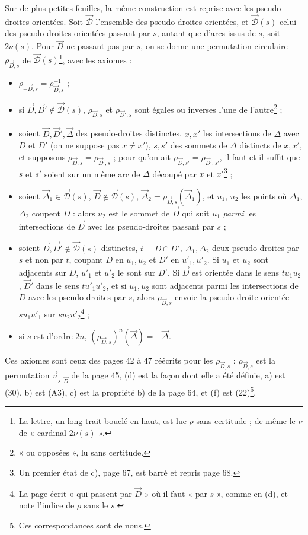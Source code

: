 \documentclass[11pt,a4paper]{article}
\begin{document}
Sur de plus petites feuilles, la même construction est reprise avec les
pseudo-droites orientées. Soit $\vec{\mathcal{D}}$ l'ensemble des
pseudo-droites orientées, et $\vec{\mathcal{D}}(s)$ celui des pseudo-droites
orientées passant par $s$, autant que d'arcs issus de $s$, soit $2\nu(s)$.
Pour $\vec{D}$ ne passant pas par $s$, on se donne une permutation circulaire
$\rho_{\vec{D},s}$ de $\vec{\mathcal{D}}(s)$\footnote{La lettre, un long trait
bouclé en haut, est lue $\rho$ sans certitude ; de même le $\nu$ de
« cardinal $2\nu(s)$ ».}, avec les axiomes :
\begin{itemize}
  \item[a)] $\rho_{-\vec{D},s} = \rho_{\vec{D},s}^{-1}$ ;
  \item[b)] si $\vec{D}, \vec{D}' \notin \vec{\mathcal{D}}(s)$, $\rho_{\vec{D},s}$ et
  $\rho_{\vec{D}',s}$ sont égales ou inverses l'une de l'autre\footnote{« ou
  opposées », lu sans certitude.} ;
  \item[c)] soient $\vec{D}, \vec{D}', \vec{\Delta}$ des pseudo-droites
  distinctes, $x, x'$ les intersections de $\Delta$ avec $D$ et $D'$ (on ne
  suppose pas $x \neq x'$), $s, s'$ des sommets de $\Delta$ distincts de $x,
  x'$, et supposons $\rho_{\vec{D},s} = \rho_{\vec{D}',s}$ ; pour qu'on ait
  $\rho_{\vec{D},s'} = \rho_{\vec{D}',s'}$, il faut et il suffit que $s$ et
  $s'$ soient sur un même arc de $\Delta$ découpé par $x$ et
  $x'$\footnote{Un premier état de c), page 67, est barré et repris page
  68.} ;
  \item[(d)] soient $\vec{\Delta}_1 \in \vec{\mathcal{D}}(s)$, $\vec{D} \notin
  \vec{\mathcal{D}}(s)$, $\vec{\Delta}_2 = \rho_{\vec{D},s}(\vec{\Delta}_1)$,
  et $u_1$, $u_2$ les points où $\Delta_1$, $\Delta_2$ coupent $D$ : alors
  $u_2$ est le sommet de $\vec{D}$ qui suit $u_1$ \emph{parmi} les
  intersections de $\vec{D}$ avec les pseudo-droites passant par $s$ ;
  \item[(e)] soient $\vec{D}, \vec{D}' \notin \vec{\mathcal{D}}(s)$ distinctes,
  $t = D \cap D'$, $\Delta_1, \Delta_2$ deux pseudo-droites par $s$ et non par
  $t$, coupant $D$ en $u_1, u_2$ et $D'$ en $u'_1, u'_2$. Si $u_1$ et $u_2$ sont
  adjacents sur $D$, $u'_1$ et $u'_2$ le sont sur $D'$. Si $\vec{D}$ est
  orientée dans le sens $t u_1 u_2$, $\vec{D}'$ dans le sens $t u'_1 u'_2$, et
  si $u_1, u_2$ sont adjacents parmi les intersections de $D$ avec les
  pseudo-droites par $s$, alors $\rho_{\vec{D},s}$ envoie la pseudo-droite
  orientée $s u_1 u'_1$ sur $s u_2 u'_2$\footnote{La page écrit « qui passent
  par $\vec{D}$ » où il faut « par $s$ », comme en (d), et note l'indice de
  $\rho$ sans le $s$.} ;
  \item[(f)] si $s$ est d'ordre $2n$, $(\rho_{\vec{D},s})^n(\vec{\Delta}) =
  -\vec{\Delta}$.
\end{itemize}
Ces axiomes sont ceux des pages 42 à 47 réécrits pour les
$\rho_{\vec{D},s}$ : $\rho_{\vec{D},s}$ est la permutation
$\vec{u}_{s,\vec{D}}$ de la page 45, (d) est la façon dont elle a été
définie, a) est (30), b) est (A3), c) est la propriété b) de la page 64, et (f) est (22)\footnote{Ces correspondances sont
de nous.}.
\end{document}
